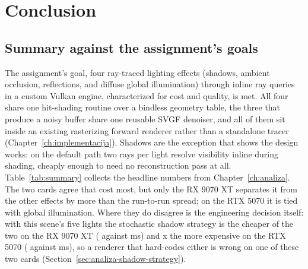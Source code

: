 \chapter{Conclusion}
\label{ch:zakljucak}


\section{Summary against the assignment's goals}

The assignment's goal, four ray-traced lighting effects (shadows, ambient occlusion, reflections,
and diffuse global illumination) through inline ray queries in a custom Vulkan engine, characterized
for cost and quality, is met. All four share one hit-shading routine over a bindless geometry table,
the three that produce a noisy buffer share one reusable SVGF denoiser, and all of them sit inside an
existing rasterizing forward renderer rather than a standalone tracer
(Chapter~\ref{ch:implementacija}). Shadows are the exception that shows the design works: on the
default path two rays per light resolve visibility inline during shading, cheaply enough to need no
reconstruction pass at all. Table~\ref{tab:summary} collects the headline
numbers from Chapter~\ref{ch:analiza}. The two cards agree that \perfTopEffectAMD{} cost most, but only the
RX 9070 XT separates it from the other effects by more than the run-to-run spread; on the RTX 5070 it
is tied with global illumination. Where they do disagree is the engineering decision
itself: with this scene's five lights the stochastic shadow strategy is the cheaper of the two on the
RX 9070 XT (\perfShadowStochAMD{} against \perfShadowInlineAMD{} ms) and \perfShadowRatioNV{}x the
more expensive on the RTX 5070 (\perfShadowStochNV{} against \perfShadowInlineNV{} ms), so a renderer
that hard-codes either is wrong on one of these two cards
(Section~\ref{sec:analiza-shadow-strategy}).

